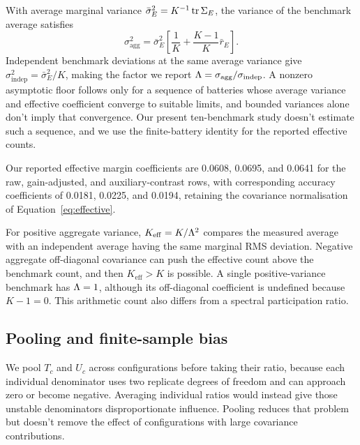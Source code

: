 With average marginal variance $\bar\sigma_E^2=K^{-1}\operatorname{tr}\Sigma_E$, the variance of the benchmark average satisfies
\begin{equation}
\sigma_{\mathrm{agg}}^2=\bar\sigma_E^2\left[\frac1K+\frac{K-1}{K}\bar r_E\right]. \end{equation}
Independent benchmark deviations at the same average variance give $\sigma_{\mathrm{indep}}^2=\bar\sigma_E^2/K$, making the factor we report $\Lambda=\sigma_{\mathrm{agg}}/\sigma_{\mathrm{indep}}$. A nonzero asymptotic floor follows only for a sequence of batteries whose average variance and effective coefficient converge to suitable limits, and bounded variances alone don't imply that convergence. Our present ten-benchmark study doesn't estimate such a sequence, and we use the finite-battery identity for the reported effective counts.

Our reported effective margin coefficients are 0.0608, 0.0695, and 0.0641 for the raw, gain-adjusted, and auxiliary-contrast rows, with corresponding accuracy coefficients of 0.0181, 0.0225, and 0.0194, retaining the covariance normalisation of Equation~\ref{eq:effective}.

For positive aggregate variance, $K_{\mathrm{eff}}=K/\Lambda^2$ compares the measured average with an independent average having the same marginal RMS deviation. Negative aggregate off-diagonal covariance can push the effective count above the benchmark count, and then $K_{\mathrm{eff}}>K$ is possible. A single positive-variance benchmark has $\Lambda=1$, although its off-diagonal coefficient is undefined because $K-1=0$. This arithmetic count also differs from a spectral participation ratio.

\subsection{Pooling and finite-sample bias}
We pool $T_c$ and $U_c$ across configurations before taking their ratio, because each individual denominator uses two replicate degrees of freedom and can approach zero or become negative. Averaging individual ratios would instead give those unstable denominators disproportionate influence. Pooling reduces that problem but doesn't remove the effect of configurations with large covariance contributions.

